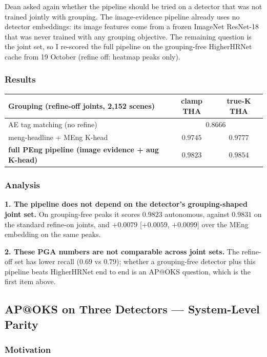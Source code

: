 Dean asked again whether the pipeline should be tried on a detector that was not trained jointly with grouping. The image-evidence pipeline already uses no detector embeddings: its image features come from a frozen ImageNet ResNet-18 that was never trained with any grouping objective. The remaining question is the joint set, so I re-scored the full pipeline on the grouping-free HigherHRNet cache from 19 October (refine off: heatmap peaks only).

\subsubsection{Results}

\begin{tabular}{lcc}
\hline
\textbf{Grouping (refine-off joints, 2,152 scenes)} & \textbf{clamp THA} & \textbf{true-K THA} \\
\hline
AE tag matching (no refine)                       & \multicolumn{2}{c}{$0.8666$} \\
meng-headline + MEng K-head                       & $0.9745$ & $0.9777$ \\
\textbf{full PEng pipeline (image evidence + aug K-head)} & $\mathbf{0.9823}$ & $\mathbf{0.9854}$ \\
\hline
\end{tabular}

\subsubsection{Analysis}

\textbf{1. The pipeline does not depend on the detector's grouping-shaped joint set.} On grouping-free peaks it scores $0.9823$ autonomous, against $0.9831$ on the standard refine-on joints, and $+0.0079$ [$+0.0059$, $+0.0099$] over the MEng embedding on the same peaks.

\textbf{2. These PGA numbers are not comparable across joint sets.} The refine-off set has lower recall ($0.69$ vs $0.79$); whether a grouping-free detector plus this pipeline beats HigherHRNet end to end is an AP@OKS question, which is the first item above.

\subsection{AP@OKS on Three Detectors --- System-Level Parity}

\subsubsection{Motivation}

